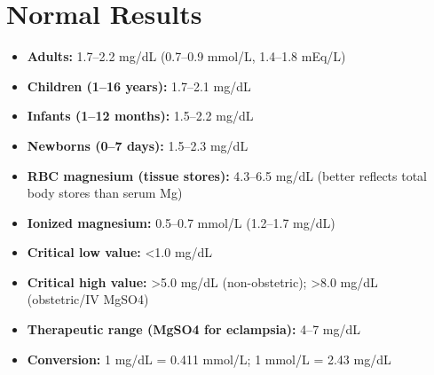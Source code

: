 \section*{Normal Results}
\begin{itemize}
  \item \textbf{Adults:} 1.7--2.2 mg/dL (0.7--0.9 mmol/L, 1.4--1.8 mEq/L) \cite{fischbach2023manual}
  \item \textbf{Children (1--16 years):} 1.7--2.1 mg/dL
  \item \textbf{Infants (1--12 months):} 1.5--2.2 mg/dL
  \item \textbf{Newborns (0--7 days):} 1.5--2.3 mg/dL
  \item \textbf{RBC magnesium (tissue stores):} 4.3--6.5 mg/dL (better reflects total body stores than serum Mg)
  \item \textbf{Ionized magnesium:} 0.5--0.7 mmol/L (1.2--1.7 mg/dL)
  \item \textbf{Critical low value:} <1.0 mg/dL
  \item \textbf{Critical high value:} >5.0 mg/dL (non-obstetric); >8.0 mg/dL (obstetric/IV MgSO4)
  \item \textbf{Therapeutic range (MgSO4 for eclampsia):} 4--7 mg/dL
  \item \textbf{Conversion:} 1 mg/dL = 0.411 mmol/L; 1 mmol/L = 2.43 mg/dL
\end{itemize}


